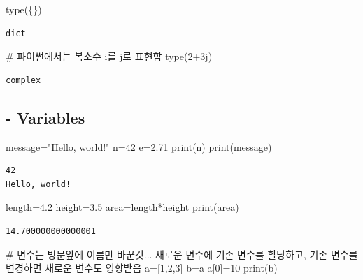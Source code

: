 \documentclass[
  letterpaper,
  DIV=11,
  numbers=noendperiod]{scrreprt}
\newenvironment{Shaded}{\begin{snugshade}}{\end{snugshade}}
\newcommand{\BuiltInTok}[1]{\textcolor[rgb]{0.00,0.23,0.31}{#1}}
\newcommand{\CommentTok}[1]{\textcolor[rgb]{0.37,0.37,0.37}{#1}}
\newcommand{\DecValTok}[1]{\textcolor[rgb]{0.68,0.00,0.00}{#1}}
\newcommand{\FloatTok}[1]{\textcolor[rgb]{0.68,0.00,0.00}{#1}}
\newcommand{\NormalTok}[1]{\textcolor[rgb]{0.00,0.23,0.31}{#1}}
\newcommand{\OperatorTok}[1]{\textcolor[rgb]{0.37,0.37,0.37}{#1}}
\newcommand{\OtherTok}[1]{\textcolor[rgb]{0.00,0.23,0.31}{#1}}
\newcommand{\StringTok}[1]{\textcolor[rgb]{0.13,0.47,0.30}{#1}}
\begin{document}
\begin{Shaded}
\begin{Highlighting}[]
\BuiltInTok{type}\NormalTok{(\{\})}
\end{Highlighting}
\end{Shaded}

\begin{verbatim}
dict
\end{verbatim}

\begin{Shaded}
\begin{Highlighting}[]
\CommentTok{\# 파이썬에서는 복소수 i를 j로 표현함}
\BuiltInTok{type}\NormalTok{(}\DecValTok{2}\OperatorTok{+}\OtherTok{3j}\NormalTok{)}
\end{Highlighting}
\end{Shaded}

\begin{verbatim}
complex
\end{verbatim}

\subsection{- Variables}\label{variables}

\begin{Shaded}
\begin{Highlighting}[]
\NormalTok{message}\OperatorTok{=}\StringTok{"Hello, world!"}
\NormalTok{n}\OperatorTok{=}\DecValTok{42}
\NormalTok{e}\OperatorTok{=}\FloatTok{2.71}
\BuiltInTok{print}\NormalTok{(n)}
\BuiltInTok{print}\NormalTok{(message)}
\end{Highlighting}
\end{Shaded}

\begin{verbatim}
42
Hello, world!
\end{verbatim}

\begin{Shaded}
\begin{Highlighting}[]
\NormalTok{length}\OperatorTok{=}\FloatTok{4.2}
\NormalTok{height}\OperatorTok{=}\FloatTok{3.5}
\NormalTok{area}\OperatorTok{=}\NormalTok{length}\OperatorTok{*}\NormalTok{height}
\BuiltInTok{print}\NormalTok{(area)}
\end{Highlighting}
\end{Shaded}

\begin{verbatim}
14.700000000000001
\end{verbatim}

\begin{Shaded}
\begin{Highlighting}[]
\CommentTok{\# 변수는 방문앞에 이름만 바꾼것... 새로운 변수에 기존 변수를 할당하고, 기존 변수를 변경하면 새로운 변수도 영향받음}
\NormalTok{a}\OperatorTok{=}\NormalTok{[}\DecValTok{1}\NormalTok{,}\DecValTok{2}\NormalTok{,}\DecValTok{3}\NormalTok{]}
\NormalTok{b}\OperatorTok{=}\NormalTok{a}
\NormalTok{a[}\DecValTok{0}\NormalTok{]}\OperatorTok{=}\DecValTok{10}
\BuiltInTok{print}\NormalTok{(b)}
\end{Highlighting}
\end{Shaded}
\end{document}
